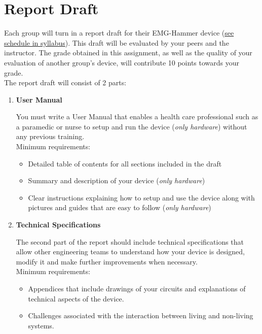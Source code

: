 \documentclass{article}
\begin{document}
\section*{Report Draft}
Each group will turn in a report draft for their EMG-Hammer device (\href{https://github.com/jlongc12/BIOE_385/blob/main/general_course_materials/syllabus.pdf}{see schedule in syllabus}). This draft will be evaluated by your peers and the instructor. The grade obtained in this assignment, as well as the quality of your evaluation of another group’s device, will contribute 10 points towards your grade.\\

The report draft will consist of 2 parts:
\begin{enumerate}
	\item \textbf{User Manual}
	
	You must write a User Manual that enables a health care professional such as a paramedic or nurse to setup and run the device (\textit{only hardware}) without any previous training.\\
	
	Minimum requirements:
	\begin{itemize}
		\item Detailed table of contents for all sections included in the draft
		\item Summary and description of your device (\textit{only hardware})
		\item Clear instructions explaining how to setup and use the device along with pictures and guides that are easy to follow (\textit{only hardware})
	\end{itemize}
	
	\item \textbf{Technical Specifications}
	
	The second part of the report should include technical specifications that allow other engineering teams to understand how your device is designed, modify it and make further improvements when necessary.\\
	
	Minimum requirements:
	\begin{itemize}
		\item Appendices that include drawings of your circuits and explanations of technical aspects of the device.
		\item Challenges associated with the interaction between living and non-living systems.
	\end{itemize}
\end{enumerate}
\end{document}
